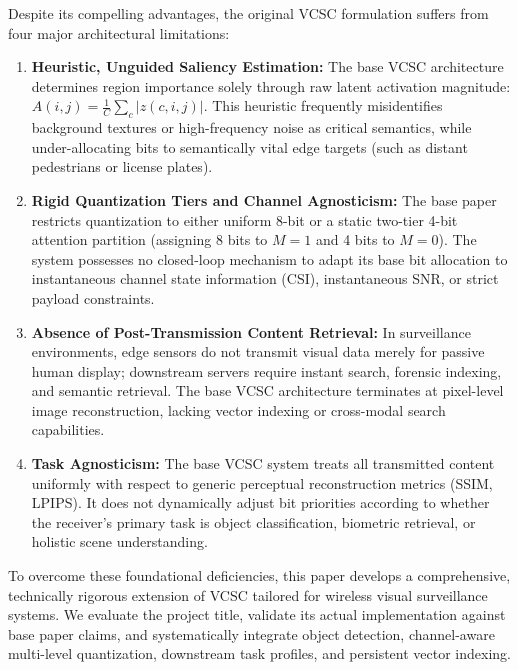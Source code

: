 \documentclass[journal,twocolumn]{IEEEtran}
\begin{document}
Despite its compelling advantages, the original VCSC formulation \cite{gong2026wireless} suffers from four major architectural limitations:
\begin{enumerate}
    \item \textbf{Heuristic, Unguided Saliency Estimation:} The base VCSC architecture determines region importance solely through raw latent activation magnitude: $A(i,j) = \frac{1}{C}\sum_c |z(c,i,j)|$. This heuristic frequently misidentifies background textures or high-frequency noise as critical semantics, while under-allocating bits to semantically vital edge targets (such as distant pedestrians or license plates).
    \item \textbf{Rigid Quantization Tiers and Channel Agnosticism:} The base paper restricts quantization to either uniform 8-bit or a static two-tier 4-bit attention partition (assigning 8 bits to $M=1$ and 4 bits to $M=0$). The system possesses no closed-loop mechanism to adapt its base bit allocation to instantaneous channel state information (CSI), instantaneous SNR, or strict payload constraints.
    \item \textbf{Absence of Post-Transmission Content Retrieval:} In surveillance environments, edge sensors do not transmit visual data merely for passive human display; downstream servers require instant search, forensic indexing, and semantic retrieval. The base VCSC architecture terminates at pixel-level image reconstruction, lacking vector indexing or cross-modal search capabilities.
    \item \textbf{Task Agnosticism:} The base VCSC system treats all transmitted content uniformly with respect to generic perceptual reconstruction metrics (SSIM, LPIPS). It does not dynamically adjust bit priorities according to whether the receiver's primary task is object classification, biometric retrieval, or holistic scene understanding.
\end{enumerate}

To overcome these foundational deficiencies, this paper develops a comprehensive, technically rigorous extension of VCSC tailored for wireless visual surveillance systems. We evaluate the project title, validate its actual implementation against base paper claims, and systematically integrate object detection, channel-aware multi-level quantization, downstream task profiles, and persistent vector indexing.
\end{document}
